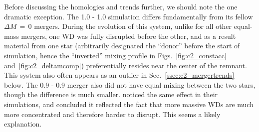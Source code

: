 Before discussing the homologies and trends further, we should note the one dramatic exception.  The 1.0 - 1.0 {\Msun} simulation differs fundamentally from its fellow $\Delta M\,=\,0$ mergers.  During the evolution of this system, unlike for all other equal-mass mergers, one WD was fully disrupted before the other, and as a result material from one star (arbitrarily designated the ``donor'' before the start of simulation, hence the ``inverted'' mixing profile in Figs.~\ref{fig:c2_constacc} and~\ref{fig:c2_deltamcomp}) preferentially resides near the center of the remnant.  This system also often appears as an outlier in Sec.~\ref{ssec:c2_mergertrends} below.  The 0.9 - 0.9 {\Msun} merger also did not have equal mixing between the two stars, though the difference is much smaller.  \cite{rask+12} noticed the same effect in their simulations, and concluded it reflected the fact that more massive WDs are much more concentrated and therefore harder to disrupt.  This seems a likely explanation.


